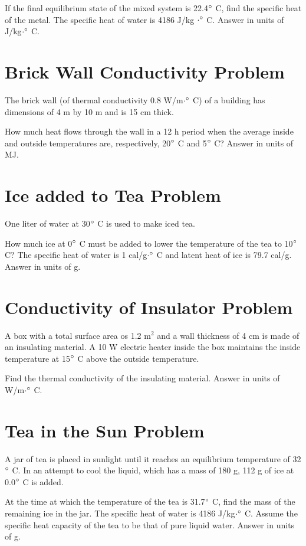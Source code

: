 \documentclass[../physics12.tex]{subfiles}
\begin{document}
If the final equilibrium state of the mixed system is 22.4$\degree$ C, find the specific heat of the metal. The specific heat of water is 4186 J/kg $\cdot\degree$ C. Answer in units of J/kg$\cdot\degree$ C.

\section{Brick Wall Conductivity Problem}
The brick wall (of thermal conductivity 0.8 W/m$\cdot\degree$ C) of a building has dimensions of 4 m by 10 m and is 15 cm thick.

How much heat flows through the wall in a 12 h period when the average inside and outside temperatures are, respectively, 20$\degree$ C and 5$\degree$ C? Answer in units of MJ.

\section{Ice added to Tea Problem}
One liter of water at 30$\degree$ C is used to make iced tea. 

How much ice at 0$\degree$ C must be added to lower the temperature of the tea to 10$\degree$ C? The specific heat of water is 1 cal/g$\cdot\degree$ C and latent heat of ice is 79.7 cal/g. Answer in units of g.

\section{Conductivity of Insulator Problem}
A box with a total surface area os 1.2 m$^2$ and a wall thickness of 4 cm is made of an insulating material. A 10 W electric heater inside the box maintains 
the inside temperature at 15$\degree$ C above the outside temperature. 

Find the thermal conductivity of the insulating material. Answer in units of W/m$\cdot\degree$ C.

\section{Tea in the Sun Problem}
A jar of tea is placed in sunlight until it reaches an equilibrium temperature of 32$\degree$ C. In an attempt to cool the liquid, which has a mass of 180 g, 112 g of ice at 0.0$\degree$ C is added.

At the time at which the temperature of the tea is 31.7$\degree$ C, find the mass of the remaining ice in the jar. The specific heat of water is 4186 J/kg$\cdot\degree$ C. Assume the specific heat capacity of the tea to be that of pure liquid water. Answer in units of g.
\end{document}
